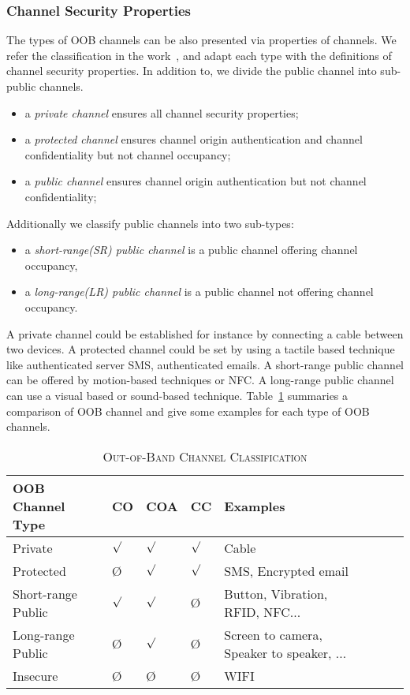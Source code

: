 \subsubsection{Channel Security Properties}

The types of OOB channels can be also presented via properties of channels. We refer the classification in the work~\cite{6687314}, and adapt each type with the definitions of channel security properties. In addition to, we divide the public channel into sub-public channels. 
\begin{itemize}
 \item a \textit{private channel} ensures all channel security properties;
 \item a \textit{protected channel} ensures channel origin authentication and channel confidentiality but not channel occupancy;
 \item a \textit{public channel} ensures channel origin authentication but not channel confidentiality;
\end{itemize}

Additionally we classify public channels into two sub-types: 
\begin{itemize}
 \item a \textit{short-range(SR) public channel} is a public channel offering channel occupancy,
 \item a \textit{long-range(LR) public channel} is a public channel not offering channel occupancy.
\end{itemize}

A private channel could be established for instance by connecting a cable between two devices. A protected channel could be set by using a tactile based technique like authenticated server SMS, authenticated emails. A short-range public channel can be offered by motion-based techniques or NFC. A long-range public channel can use a visual based or sound-based technique. Table~\ref{tableproperties} summaries a comparison of OOB channel and give some examples for each type of OOB channels.

\begin{table}
\centering
\caption{\textsc{Out-of-Band Channel Classification}}
\label{tableproperties}
{\scriptsize
\begin{tabular}{ l l l l l l l l | }
\hline
OOB Channel Type & CO & COA & CC & Examples \\
\hline\hline
Private & $\surd$ & $\surd$ & $\surd$ & Cable \\ \hline
Protected & \O & $\surd$ & $\surd$ & SMS, Encrypted email \\ \hline
Short-range Public & $\surd$ & $\surd$ & \O & Button, Vibration, RFID, NFC... \\ \hline
Long-range Public & \O & $\surd$& \O & Screen to camera, Speaker to speaker, ... \\ \hline
Insecure & \O & \O & \O & WIFI \\ 
\end{tabular}
}
\end{table}


